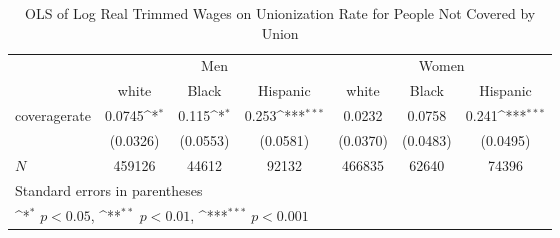 \begin{table}[htbp]\centering
\def\sym#1{\ifmmode^{#1}\else\(^{#1}\)\fi}
\caption{OLS of Log Real Trimmed Wages on Unionization Rate for People Not Covered by Union}
\begin{tabular}{l*{6}{c}}
\hline\hline
            &\multicolumn{3}{c}{Men}                                          &\multicolumn{3}{c}{Women}                                        \\\cmidrule(lr){2-4}\cmidrule(lr){5-7}
            &\multicolumn{1}{c}{white}&\multicolumn{1}{c}{Black}&\multicolumn{1}{c}{Hispanic}&\multicolumn{1}{c}{white}&\multicolumn{1}{c}{Black}&\multicolumn{1}{c}{Hispanic}\\
\hline
coveragerate&      0.0745\sym{*}  &       0.115\sym{*}  &       0.253\sym{***}&      0.0232         &      0.0758         &       0.241\sym{***}\\
            &    (0.0326)         &    (0.0553)         &    (0.0581)         &    (0.0370)         &    (0.0483)         &    (0.0495)         \\
\hline
\(N\)       &      459126         &       44612         &       92132         &      466835         &       62640         &       74396         \\
\hline\hline
\multicolumn{7}{l}{\footnotesize Standard errors in parentheses}\\
\multicolumn{7}{l}{\footnotesize \sym{*} \(p<0.05\), \sym{**} \(p<0.01\), \sym{***} \(p<0.001\)}\\
\end{tabular}
\end{table}
